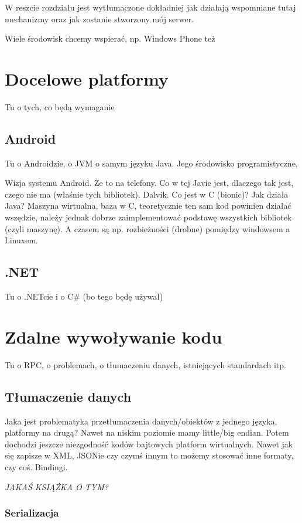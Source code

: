 \documentclass[twoside,a4paper]{book}
\begin{document}
W reszcie rozdziału jest wytłumaczone dokładniej jak działają wspomniane tutaj mechanizmy oraz jak zostanie stworzony mój serwer.

Wiele środowisk chcemy wspierać, np. Windows Phone też

\section{Docelowe platformy}
Tu o tych, co będą wymaganie

\subsection{Android}
Tu o Androidzie, o JVM o samym języku Java. Jego środowisko programistyczne.

Wizja systemu Android. Że to na telefony. Co w tej Javie jest, dlaczego tak jest, czego nie ma (właśnie tych bibliotek). Dalvik. Co jest w C (bionic)?
Jak działa Java? Maszyna wirtualna, baza w C, teoretycznie ten sam kod powinien działać wszędzie, należy jednak dobrze zaimplementować podstawę wszystkich bibliotek (czyli maszynę). A czasem są np. rozbieżności (drobne) pomiędzy windowsem a Linuxem.

\subsection{.NET}
Tu o .NETcie i o C\# (bo tego będę używał)


\section{Zdalne wywoływanie kodu}
Tu o RPC, o problemach, o tłumaczeniu danych, istniejących standardach itp.

\subsection{Tłumaczenie danych}
Jaka jest problematyka przetłumaczenia danych/obiektów z jednego języka, platformy na drugą?
Nawet na niskim poziomie mamy little/big endian. Potem dochodzi jeszcze niezgodność kodów bajtowych platform wirtualnych.
Nawet jak się zapisze w XML, JSONie czy czymś innym to możemy stosować inne formaty, czy coś. Bindingi.

\emph{JAKAŚ KSIĄŻKA O TYM?}

\subsubsection{Serializacja}
\end{document}
